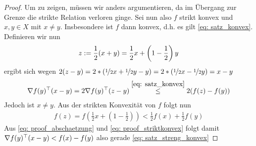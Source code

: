 \documentclass[ %
ngerman, %
a4paper, 
11pt,%
sectionreset, %
chapterstyle=framed, %
sectionstyle=pure, %
titlefont=osfamily %
]{../texmf/tex/latex/mathscriptMathTUD/mathscriptMathTUD}
\begin{document}
\begin{proof}
	Um  zu zeigen, müssen wir anders argumentieren, da im Übergang zur Grenze die strikte Relation verloren ginge. Sei nun also $f$ strikt konvex und $x,y \in X$ mit $x \neq y$. Insbesondere ist $f$ dann konvex, d.h. es gilt \eqref{eq: satz_konvex}. Definieren wir nun
	\begin{equation*}
		z \mathrel{:=} \frac{1}{2}(x+y) = \frac{1}{2} x + \left(1 - \frac{1}{2}\right) y 
	\end{equation*}
	ergibt sich wegen $2(z-y) = 2 * \left( \lfrac{1}{2}x + \lfrac{1}{2}y - y \right) = 2 * \left( \lfrac{1}{2}x - \lfrac{1}{2}y  \right) = x -y$
	\begin{align} \label{eq: proof_abschaetzung}
		\nabla f(y)^{\top} (x-y) = 2 \nabla f(y)^{\top} (z-y) \overset{\eqref{eq: satz_konvex}}{\leq} 2( f(z) - f(y))
	\end{align}
	Jedoch ist $x \neq y$. Aus der strikten Konvexität von $f$ folgt nun
	\begin{align} \label{eq: proof_striktkonvex}
		f(z) = f \left( \frac{1}{2} x + \left( 1 - \frac{1}{2} \right) \right) < \frac{1}{2} f(x) + \frac{1}{2} f(y)
	\end{align}
	Aus \eqref{eq: proof_abschaetzung} und \eqref{eq: proof_striktkonvex} folgt damit $\nabla f(y)^{\top} (x-y) < f(x) - f(y)$ also gerade \eqref{eq: satz_streng_konvex}
\end{proof}
\end{document}
